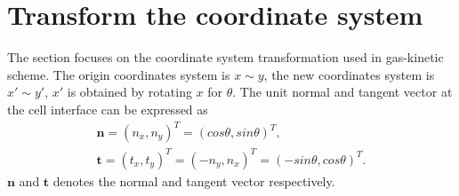 \documentclass[review]{elsarticle}
\begin{document}
\section{Transform the coordinate system} 
The section focuses on the coordinate system transformation used in gas-kinetic scheme. The origin coordinates system is $x \sim y$, 
the new coordinates system is $x'\sim y'$, $x'$ is obtained by rotating $x$ for $\theta$. The unit normal and tangent vector at the cell interface can be expressed as  
\begin{equation}\label{normal}
	\begin{gathered}
		\bm{n}=(n_x, n_y)^T = (cos\theta, sin\theta)^T,\\
		\bm{t} = (t_x, t_y)^T = (-n_y, n_x)^T=(-sin\theta, cos\theta)^T.
	\end{gathered}
\end{equation}
$\bm{n}$ and $\bm{t}$ denotes the normal and tangent vector respectively.
\end{document}
